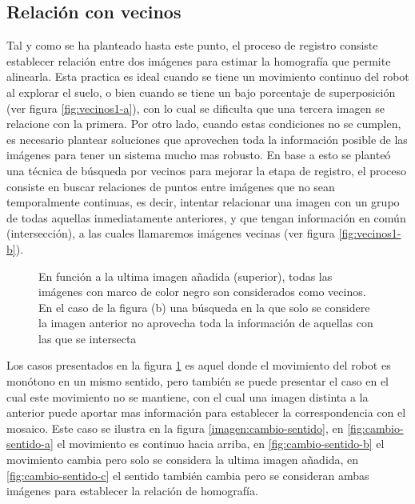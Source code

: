 \subsection{Relación con vecinos}\label{seccion-vecinos}

Tal y como se ha planteado hasta este punto, el proceso de registro consiste establecer relación entre dos imágenes para estimar la homografía que permite alinearla. Esta practica es ideal cuando se tiene un movimiento continuo del robot al explorar el suelo, o bien cuando se tiene un bajo porcentaje de superposición (ver figura \ref{fig:vecinos1-a}), con lo cual se dificulta que una tercera imagen se relacione con la primera. Por otro lado, cuando estas condiciones no se cumplen, es necesario plantear soluciones que aprovechen toda la información posible de las imágenes para tener un sistema mucho mas robusto. En base a esto se planteó una técnica de búsqueda por vecinos para mejorar la etapa de registro, el proceso consiste en buscar relaciones de puntos entre imágenes que no sean temporalmente continuas, es decir, intentar relacionar una imagen con un grupo de todas aquellas inmediatamente anteriores, y que tengan información en común (intersección), a las cuales llamaremos imágenes vecinas (ver figura \ref{fig:vecinos1-b}).


\begin{figure}[h]
	\centering     %
	\hspace{10mm}%
	\caption[Superposición de imagenes vecinas, mismo sentido]{En función a la ultima imagen añadida (superior), todas las imágenes con marco de color negro son considerados como vecinos. En el caso de la figura (b) una búsqueda en la que solo se considere la imagen anterior no aprovecha toda la información de aquellas con las que se intersecta}
	\label{imagen:vecinos1}
\end{figure}

Los casos presentados en la figura \ref{imagen:vecinos1} es aquel donde el movimiento del robot es monótono en un mismo sentido, pero también se puede presentar el caso en el cual este movimiento no se mantiene, con el cual una imagen distinta a la anterior puede aportar mas información para establecer la correspondencia con el mosaico. Este caso se ilustra en la figura \ref{imagen:cambio-sentido}, en \ref{fig:cambio-sentido-a} el movimiento es continuo hacia arriba, en \ref{fig:cambio-sentido-b} el movimiento cambia pero solo se considera la ultima imagen añadida, en \ref{fig:cambio-sentido-c} el sentido también cambia pero se consideran ambas imágenes para establecer la relación de homografía.

